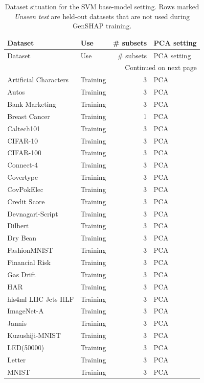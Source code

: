 \begin{scriptsize}
\setlength{\tabcolsep}{5pt}
\begin{longtable}{p{4.1cm}p{2.2cm}r p{3.5cm}}
\caption{Dataset situation for the SVM base-model setting. Rows marked \emph{Unseen test} are held-out datasets that are not used during GenSHAP training.}\label{tab:dataset-situation-svm}\\
\toprule
Dataset & Use & \# subsets & PCA setting \\
\midrule
\endfirsthead
\toprule
Dataset & Use & \# subsets & PCA setting \\
\midrule
\endhead
\midrule
\multicolumn{4}{r}{Continued on next page} \\
\endfoot
\bottomrule
\endlastfoot
Artificial Characters & Training & 3 & PCA \\
Autos & Training & 3 & PCA \\
Bank Marketing & Training & 3 & PCA \\
Breast Cancer & Training & 1 & PCA \\
Caltech101 & Training & 3 & PCA \\
CIFAR-10 & Training & 3 & PCA \\
CIFAR-100 & Training & 3 & PCA \\
Connect-4 & Training & 3 & PCA \\
Covertype & Training & 3 & PCA \\
CovPokElec & Training & 3 & PCA \\
Credit Score & Training & 3 & PCA \\
Devnagari-Script & Training & 3 & PCA \\
Dilbert & Training & 3 & PCA \\
Dry Bean & Training & 3 & PCA \\
FashionMNIST & Training & 3 & PCA \\
Financial Risk & Training & 3 & PCA \\
Gas Drift & Training & 3 & PCA \\
HAR & Training & 3 & PCA \\
hls4ml LHC Jets HLF & Training & 3 & PCA \\
ImageNet-A & Training & 3 & PCA \\
Jannis & Training & 3 & PCA \\
Kuzushiji-MNIST & Training & 3 & PCA \\
LED(50000) & Training & 3 & PCA \\
Letter & Training & 3 & PCA \\
MNIST & Training & 3 & PCA \\

\end{longtable}
\end{scriptsize}
